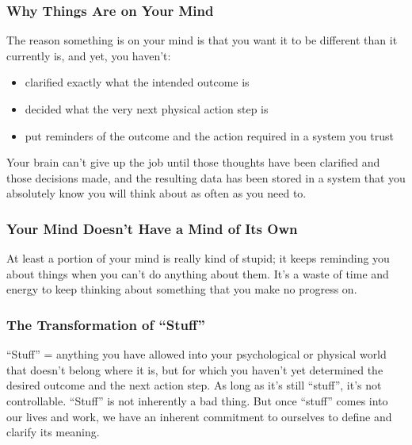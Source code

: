 \documentclass[letterpaper]{article}
\begin{document}
\subsubsection*{Why Things Are on Your Mind}
The reason something is on your mind is that you want it to be different than it currently is, and yet, you haven't:
\begin{itemize}
\item clarified exactly what the intended outcome is
\item decided what the very next physical action step is
\item put reminders of the outcome and the action required in a system you trust
\end{itemize}
Your brain can't give up the job until those thoughts have been clarified and those decisions made, and the resulting data has been stored in a system that you absolutely know you will think about as often as you need to.

\subsubsection*{Your Mind Doesn't Have a Mind of Its Own}
At least a portion of your mind is really kind of stupid; it keeps reminding you about things when you can't do anything about them. It's a waste of time and energy to keep thinking about something that you make no progress on.

\subsubsection*{The Transformation of ``Stuff''}
``Stuff'' = anything you have allowed into your psychological or physical world that doesn't belong where it is, but
for which you haven't yet determined the desired outcome and the next action step. As long as it's still ``stuff'', it's not controllable. ``Stuff'' is not inherently a bad thing. But once ``stuff'' comes into our lives and work, we have an inherent commitment to ourselves to define and clarify its meaning.
\end{document}
